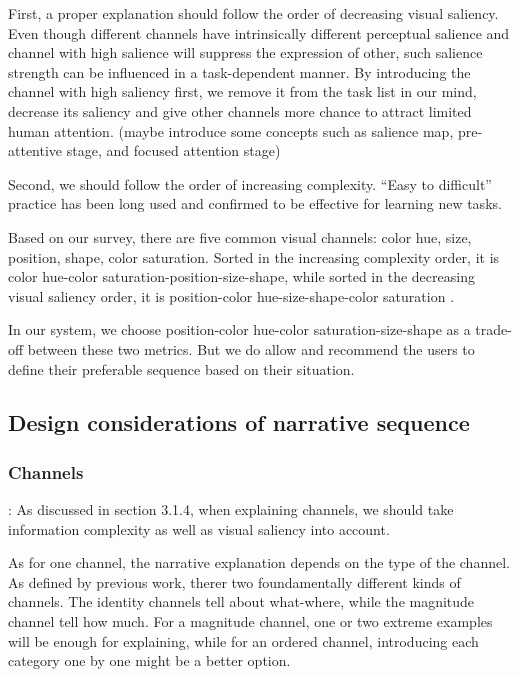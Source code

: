 First, a proper explanation should follow the order of decreasing visual saliency.\cite{cleveland_graphical_1984} Even though different channels have intrinsically different perceptual salience and channel with high salience will suppress the expression of other, such salience strength can be influenced in a task-dependent manner. \cite{nothdurft_salience_2000} By introducing the channel with high saliency first, we remove it from the task list in our mind, decrease its saliency and give other channels more chance to attract limited human attention. (maybe introduce some concepts such as salience map, pre-attentive stage, and focused attention stage) \par
 Second, we should follow the order of increasing complexity. “Easy to difficult” practice has been long used and confirmed to be effective for learning new tasks\cite{bliss_effects_1992}.\par
 Based on our survey, there are five common visual channels: color hue, size, position, shape, color saturation. Sorted in the increasing complexity order, it is color hue-color saturation-position-size-shape, while sorted in the decreasing visual saliency order, it is position-color hue-size-shape-color saturation \cite{munzner_visualization_2014,cleveland_graphical_1984}.  \par
In our system, we choose position-color hue-color saturation-size-shape as a trade-off between these two metrics. But we do allow and recommend the users to define their preferable sequence based on their situation. 


\subsection{Design considerations of narrative sequence}
\subsubsection{Channels}: As discussed in section 3.1.4, when explaining channels, we should take information complexity as well as visual saliency into account. 

As for one channel, the narrative explanation depends on the type of the channel. As defined by previous work, therer two foundamentally different kinds of channels. The identity channels tell about what-where, while the magnitude channel tell how much. For a magnitude channel, one or two extreme examples will be enough for explaining, while for an ordered channel, introducing each category one by one might be a better option.\par
